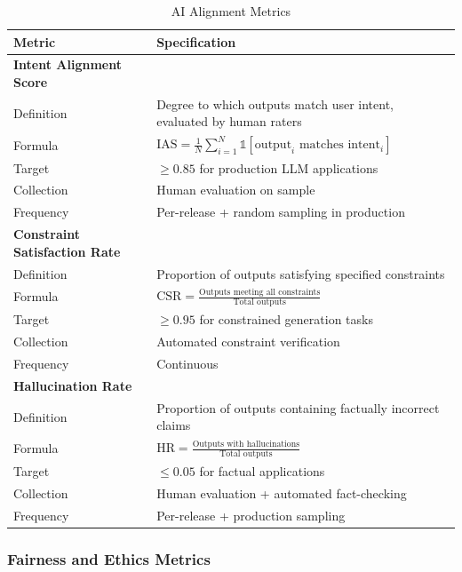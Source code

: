 \begin{table}[!htbp]
\centering
\caption{AI Alignment Metrics}
\label{tab:alignment_metrics}
\small
\begin{tabularx}{\linewidth}{@{}l X@{}}
\toprule
\textbf{Metric} & \textbf{Specification} \\
\midrule
\textbf{Intent Alignment Score} & \\
Definition & Degree to which outputs match user intent, evaluated by human raters \\
Formula & $\text{IAS} = \frac{1}{N}\sum_{i=1}^{N} \mathbb{1}[\text{output}_i \text{ matches intent}_i]$ \\
Target & $\geq 0.85$ for production LLM applications \\
Collection & Human evaluation on sample \\
Frequency & Per-release + random sampling in production \\
\addlinespace

\textbf{Constraint Satisfaction Rate} & \\
Definition & Proportion of outputs satisfying specified constraints \\
Formula & $\text{CSR} = \frac{\text{Outputs meeting all constraints}}{\text{Total outputs}}$ \\
Target & $\geq 0.95$ for constrained generation tasks \\
Collection & Automated constraint verification \\
Frequency & Continuous \\
\addlinespace

\textbf{Hallucination Rate} & \\
Definition & Proportion of outputs containing factually incorrect claims \\
Formula & $\text{HR} = \frac{\text{Outputs with hallucinations}}{\text{Total outputs}}$ \\
Target & $\leq 0.05$ for factual applications \\
Collection & Human evaluation + automated fact-checking \\
Frequency & Per-release + production sampling \\
\bottomrule
\end{tabularx}
\end{table}

\subsubsection{Fairness and Ethics Metrics}

